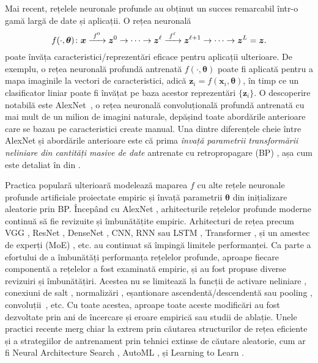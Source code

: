 \documentclass[../../book-main_ro.tex]{subfiles}
\begin{document}
Mai recent, rețelele neuronale profunde au obținut un succes remarcabil într-o gamă largă de date și aplicații. O rețea neuronală
\begin{equation}
  f(\cdot, \bm \theta) \colon \bm{x}
  \xrightarrow{\hspace{1mm} f^0 \hspace{1mm}} \bm{z}^0 \rightarrow \cdots
  \rightarrow \bm{z}^\ell \xrightarrow{\hspace{1mm} f^\ell \hspace{1mm}}
  \bm{z}^{\ell+1} \rightarrow  \cdots \to \bm{z}^L = \bm{z}.
\end{equation}
poate învăța caracteristici/reprezentări eficace pentru aplicații ulterioare. De exemplu, o rețea neuronală profundă antrenată $f(\cdot, \bm \theta)$ poate fi aplicată pentru a mapa imaginile la vectori de caracteristici, adică $\bm{z}_i = f(\bm{x}_i,\bm \theta)$, în timp ce un clasificator liniar poate fi învățat pe baza acestor reprezentări $\{\bm{z}_i\}$. O descoperire notabilă este AlexNet~\cite{krizhevsky2012imagenet}, o rețea neuronală convoluțională profundă antrenată cu mai mult de un milion de imagini naturale, depășind toate abordările anterioare care se bazau pe caracteristici create manual. Una dintre diferențele cheie între AlexNet și abordările anterioare este că prima \textit{învață parametrii transformării neliniare din cantități masive de date} antrenate cu retropropagare (BP) \cite{Back-Prop}, așa cum este detaliat în  din . 



Practica populară ulterioară modelează maparea $f$ cu alte rețele neuronale profunde artificiale proiectate empiric și învață parametrii $\bm \theta$ din inițializare aleatorie prin BP. Începând cu AlexNet \cite{krizhevsky2012imagenet}, arhitecturile rețelelor profunde moderne continuă să fie revizuite și îmbunătățite empiric. Arhitecturi de rețea precum VGG \cite{simonyan2014very}, ResNet \cite{he2016deep}, DenseNet \cite{dense-net}, CNN, RNN sau LSTM \cite{LSTM}, Transformer \cite{vaswani2017attention}, și un amestec de experți (MoE) \cite{MoE,Fedus-2022}, etc. au continuat să împingă limitele performanței. Ca parte a efortului de a îmbunătăți performanța rețelelor profunde, aproape fiecare componentă a rețelelor a fost examinată empiric, și au fost propuse diverse revizuiri și îmbunătățiri. Acestea nu se limitează la funcții de activare neliniare \cite{maas2013rectifier,klambauer2017self,xu2015empirical,nwankpa2018activation}, conexiuni de salt \cite{ronneberger2015u,he2016deep}, normalizări \cite{ioffe2015batch,ba2016layer,ulyanov2016instance,wu2018group,miyato2018spectral}, eșantionare ascendentă/descendentă sau pooling \cite{scherer2010evaluation}, convoluții~\cite{lecun1998gradient,krizhevsky2012imagenet}, etc.
Cu toate acestea, aproape toate aceste modificări au fost dezvoltate prin ani de {încercare și eroare} empirică sau studii de ablație. Unele practici recente merg chiar la extrem prin căutarea structurilor de rețea eficiente și a strategiilor de antrenament prin tehnici extinse de căutare aleatorie, cum ar fi Neural Architecture Search \cite{NAS-1,Baker2017DesigningNN}, AutoML \cite{automl}, și Learning to Learn \cite{andrychowicz2016learning}. 
\end{document}
